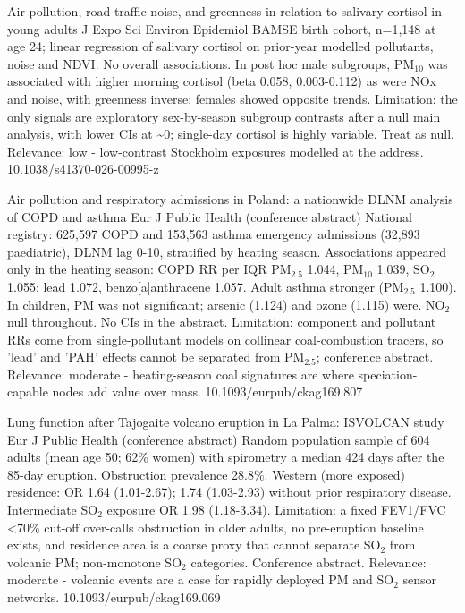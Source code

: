 \documentclass[10pt]{article}
\begin{document}
{Air pollution, road traffic noise, and greenness in relation to salivary cortisol in young adults}
{J Expo Sci Environ Epidemiol}
{BAMSE birth cohort, n=1,148 at age 24; linear regression of salivary cortisol on prior-year modelled pollutants, noise and NDVI. No overall associations. In post hoc male subgroups, PM$_{10}$ was associated with higher morning cortisol (beta 0.058, 0.003-0.112) as were NOx and noise, with greenness inverse; females showed opposite trends. Limitation: the only signals are exploratory sex-by-season subgroup contrasts after a null main analysis, with lower CIs at \textasciitilde{}0; single-day cortisol is highly variable. Treat as null. Relevance: low - low-contrast Stockholm exposures modelled at the address.}
{10.1038/s41370-026-00995-z}

\par{}\baselineskip{}\baselineskip
{}

{Air pollution and respiratory admissions in Poland: a nationwide DLNM analysis of COPD and asthma}
{Eur J Public Health (conference abstract)}
{National registry: 625,597 COPD and 153,563 asthma emergency admissions (32,893 paediatric), DLNM lag 0-10, stratified by heating season. Associations appeared only in the heating season: COPD RR per IQR PM$_{2.5}$ 1.044, PM$_{10}$ 1.039, SO$_2$ 1.055; lead 1.072, benzo[a]anthracene 1.057. Adult asthma stronger (PM$_{2.5}$ 1.100). In children, PM was not significant; arsenic (1.124) and ozone (1.115) were. NO$_2$ null throughout. No CIs in the abstract. Limitation: component and pollutant RRs come from single-pollutant models on collinear coal-combustion tracers, so 'lead' and 'PAH' effects cannot be separated from PM$_{2.5}$; conference abstract. Relevance: moderate - heating-season coal signatures are where speciation-capable nodes add value over mass.}
{10.1093/eurpub/ckag169.807}

{Lung function after Tajogaite volcano eruption in La Palma: ISVOLCAN study}
{Eur J Public Health (conference abstract)}
{Random population sample of 604 adults (mean age 50; 62\% women) with spirometry a median 424 days after the 85-day eruption. Obstruction prevalence 28.8\%. Western (more exposed) residence: OR 1.64 (1.01-2.67); 1.74 (1.03-2.93) without prior respiratory disease. Intermediate SO$_2$ exposure OR 1.98 (1.18-3.34). Limitation: a fixed FEV1/FVC <70\% cut-off over-calls obstruction in older adults, no pre-eruption baseline exists, and residence area is a coarse proxy that cannot separate SO$_2$ from volcanic PM; non-monotone SO$_2$ categories. Conference abstract. Relevance: moderate - volcanic events are a case for rapidly deployed PM and SO$_2$ sensor networks.}
{10.1093/eurpub/ckag169.069}
\end{document}
